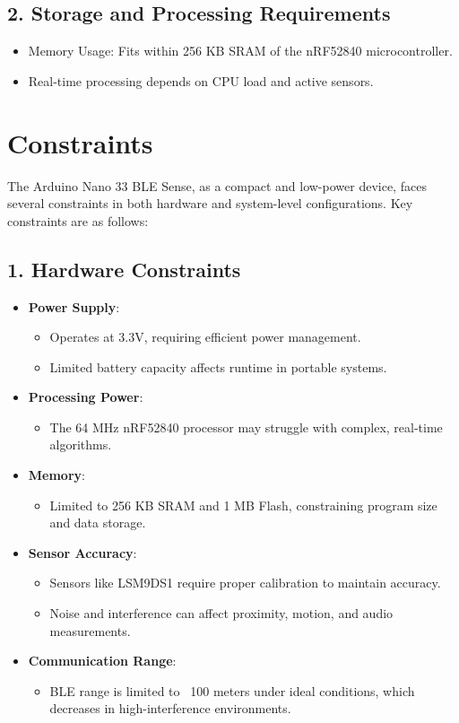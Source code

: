 	\subsection*{2. Storage and Processing Requirements}
	\begin{itemize}
		\item Memory Usage: Fits within 256 KB SRAM of the nRF52840 microcontroller.
		\item Real-time processing depends on CPU load and active sensors.
	\end{itemize}

\section{Constraints}
	The Arduino Nano 33 BLE Sense, as a compact and low-power device, faces several constraints in both hardware and system-level configurations. Key constraints are as follows:
	
	\subsection*{1. Hardware Constraints}
	
	\begin{itemize}
		\item \textbf{Power Supply}:
		\begin{itemize}
			\item Operates at 3.3V, requiring efficient power management.
			\item Limited battery capacity affects runtime in portable systems.
		\end{itemize}
		\item \textbf{Processing Power}:
		\begin{itemize}
			\item The 64 MHz nRF52840 processor may struggle with complex, real-time algorithms.
		\end{itemize}
		\item \textbf{Memory}:
		\begin{itemize}
			\item Limited to 256 KB SRAM and 1 MB Flash, constraining program size and data storage.
		\end{itemize}
		\item \textbf{Sensor Accuracy}:
		\begin{itemize}
			\item Sensors like LSM9DS1 require proper calibration to maintain accuracy.
			\item Noise and interference can affect proximity, motion, and audio measurements.
		\end{itemize}
		\item \textbf{Communication Range}:
		\begin{itemize}
			\item BLE range is limited to ~100 meters under ideal conditions, which decreases in high-interference environments.
		\end{itemize}
	\end{itemize}
	
